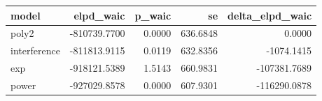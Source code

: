 \begin{tabular}{lrrrr}
\toprule
model & elpd_waic & p_waic & se & delta_elpd_waic \\
\midrule
poly2 & -810739.7700 & 0.0000 & 636.6848 & 0.0000 \\
interference & -811813.9115 & 0.0119 & 632.8356 & -1074.1415 \\
exp & -918121.5389 & 1.5143 & 660.9831 & -107381.7689 \\
power & -927029.8578 & 0.0000 & 607.9301 & -116290.0878 \\
\bottomrule
\end{tabular}
